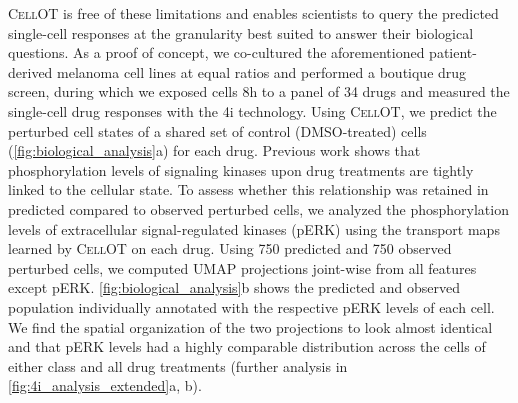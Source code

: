 \textsc{CellOT} is free of these limitations and enables scientists to query the predicted single-cell responses at the granularity best suited to answer their biological questions. As a proof of concept, we co-cultured the aforementioned patient-derived melanoma cell lines at equal ratios and performed a boutique drug screen, during which we exposed cells 8h to a panel of 34 drugs and measured the single-cell drug responses with the 4i technology. 
Using \textsc{CellOT}, 
we predict the perturbed cell states of a shared set of control (DMSO-treated) cells (\cref{fig:biological_analysis}a) for each drug.
Previous work \citep{kramer2019cellular} shows that phosphorylation levels of signaling kinases upon drug treatments are tightly linked to the cellular state. 
To assess whether this relationship was retained in predicted compared to observed perturbed cells, we analyzed the phosphorylation levels of extracellular signal-regulated kinases (pERK) using the transport maps learned by \textsc{CellOT} on each drug.
Using 750 predicted and 750 observed perturbed cells, we computed \acrshort{UMAP} projections joint-wise from all features except pERK. \cref{fig:biological_analysis}b shows the predicted and observed population individually annotated with the respective pERK levels of each cell. We find the spatial organization of the two projections to look almost identical and that pERK levels had a highly comparable distribution across the cells of either class and all drug treatments (further analysis in \cref{fig:4i_analysis_extended}a, b).


